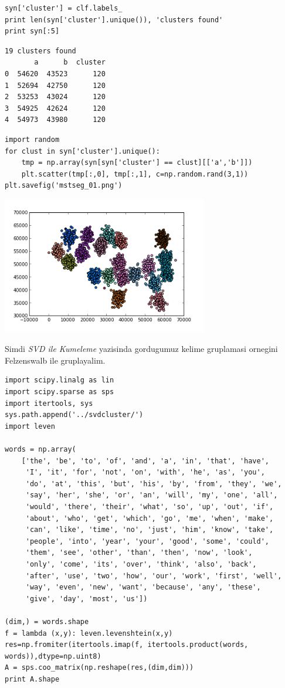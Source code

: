 \documentclass[12pt,fleqn]{article}\usepackage{../common}
\begin{document}
\begin{verbatim}
syn['cluster'] = clf.labels_
print len(syn['cluster'].unique()), 'clusters found'
print syn[:5]
\end{verbatim}

\begin{verbatim}
19 clusters found
       a      b  cluster
0  54620  43523      120
1  52694  42750      120
2  53253  43024      120
3  54925  42624      120
4  54973  43980      120
\end{verbatim}

\begin{verbatim}
import random
for clust in syn['cluster'].unique():
    tmp = np.array(syn[syn['cluster'] == clust][['a','b']])
    plt.scatter(tmp[:,0], tmp[:,1], c=np.random.rand(3,1))
plt.savefig('mstseg_01.png')
\end{verbatim}

\includegraphics[height=6cm]{mstseg_01.png}

Simdi {\em SVD ile Kumeleme} yazisinda gordugumuz kelime gruplamasi ornegini
Felzenswalb ile gruplayalim. 

\begin{verbatim}
import scipy.linalg as lin
import scipy.sparse as sps
import itertools, sys
sys.path.append('../svdcluster/')
import leven

words = np.array(
    ['the', 'be', 'to', 'of', 'and', 'a', 'in', 'that', 'have',
     'I', 'it', 'for', 'not', 'on', 'with', 'he', 'as', 'you',
     'do', 'at', 'this', 'but', 'his', 'by', 'from', 'they', 'we',
     'say', 'her', 'she', 'or', 'an', 'will', 'my', 'one', 'all',
     'would', 'there', 'their', 'what', 'so', 'up', 'out', 'if',
     'about', 'who', 'get', 'which', 'go', 'me', 'when', 'make',
     'can', 'like', 'time', 'no', 'just', 'him', 'know', 'take',
     'people', 'into', 'year', 'your', 'good', 'some', 'could',
     'them', 'see', 'other', 'than', 'then', 'now', 'look',
     'only', 'come', 'its', 'over', 'think', 'also', 'back',
     'after', 'use', 'two', 'how', 'our', 'work', 'first', 'well',
     'way', 'even', 'new', 'want', 'because', 'any', 'these',
     'give', 'day', 'most', 'us'])

(dim,) = words.shape
f = lambda (x,y): leven.levenshtein(x,y)
res=np.fromiter(itertools.imap(f, itertools.product(words, words)),dtype=np.uint8)
A = sps.coo_matrix(np.reshape(res,(dim,dim)))
print A.shape
\end{verbatim}
\end{document}
